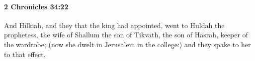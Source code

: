 
		\paragraph{2 Chronicles 34:22} %
			\label{2CHRONICLES-34-22}

			And Hilkiah, and they that the king had appointed, went to Huldah the prophetess, the wife of Shallum the son of Tikvath, the son of Hasrah, keeper of the wardrobe; (now she dwelt in Jerusalem in the college:) and they spake to her to that effect.


